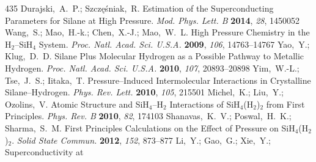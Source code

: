 \documentclass[12pt,letterpaper,oneside]{article}
\begin{document}
\begin{mcitethebibliography}{435}
\EndOfBibitem
{}
Durajski,~A.~P.; Szcz{\k e}{\'s}niak,~R. Estimation of the Superconducting
  Parameters for Silane at High Pressure. \emph{Mod. Phys. Lett. B}
  \textbf{2014}, \emph{28}, 1450052\relax
\mciteBstWouldAddEndPuncttrue
\mciteSetBstMidEndSepPunct{\mcitedefaultmidpunct}
{\mcitedefaultendpunct}{\mcitedefaultseppunct}\relax
\EndOfBibitem
{}
Wang,~S.; Mao,~H.-k.; Chen,~X.-J.; Mao,~W.~L. High Pressure Chemistry in the
  H$_2$--SiH$_4$ System. \emph{Proc. Natl. Acad. Sci. U.S.A.} \textbf{2009},
  \emph{106}, 14763--14767\relax
\mciteBstWouldAddEndPuncttrue
\mciteSetBstMidEndSepPunct{\mcitedefaultmidpunct}
{\mcitedefaultendpunct}{\mcitedefaultseppunct}\relax
\EndOfBibitem
{}
Yao,~Y.; Klug,~D.~D. Silane Plus Molecular Hydrogen as a Possible Pathway to
  Metallic Hydrogen. \emph{Proc. Natl. Acad. Sci. U.S.A.} \textbf{2010},
  \emph{107}, 20893--20898\relax
\mciteBstWouldAddEndPuncttrue
\mciteSetBstMidEndSepPunct{\mcitedefaultmidpunct}
{\mcitedefaultendpunct}{\mcitedefaultseppunct}\relax
\EndOfBibitem
{}
Yim,~W.-L.; Tse,~J.~S.; Iitaka,~T. Pressure--Induced Intermolecular
  Interactions in Crystalline Silane--Hydrogen. \emph{Phys. Rev. Lett.}
  \textbf{2010}, \emph{105}, 215501\relax
\mciteBstWouldAddEndPuncttrue
\mciteSetBstMidEndSepPunct{\mcitedefaultmidpunct}
{\mcitedefaultendpunct}{\mcitedefaultseppunct}\relax
\EndOfBibitem
{}
Michel,~K.; Liu,~Y.; Ozolins,~V. Atomic Structure and SiH$_4$--H$_2$
  Interactions of SiH$_4$(H$_2$)$_2$ from First Principles. \emph{Phys. Rev. B}
  \textbf{2010}, \emph{82}, 174103\relax
\mciteBstWouldAddEndPuncttrue
\mciteSetBstMidEndSepPunct{\mcitedefaultmidpunct}
{\mcitedefaultendpunct}{\mcitedefaultseppunct}\relax
\EndOfBibitem
{}
Shanavas,~K.~V.; Poswal,~H.~K.; Sharma,~S.~M. First Principles Calculations on
  the Effect of Pressure on SiH$_4$(H$_2$)$_2$. \emph{Solid State Commun.}
  \textbf{2012}, \emph{152}, 873--877\relax
\mciteBstWouldAddEndPuncttrue
\mciteSetBstMidEndSepPunct{\mcitedefaultmidpunct}
{\mcitedefaultendpunct}{\mcitedefaultseppunct}\relax
\EndOfBibitem
{}
Li,~Y.; Gao,~G.; Xie,~Y.;   Superconductivity at

\end{mcitethebibliography}
\end{document}
